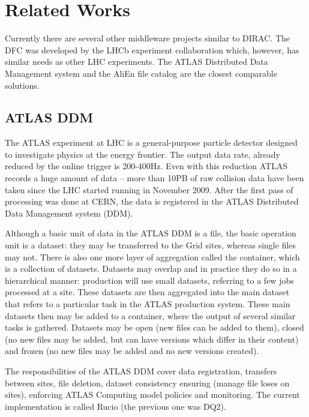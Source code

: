 \chapter{Related Works}
\label{chap:relwork}

Currently there are several other middleware projects similar to DIRAC. The DFC was developed by the LHCb experiment collaboration which, however, has similar needs as other LHC experiments. The ATLAS
Distributed Data Management system and the AliEn file catalog are the closest comparable solutions.


\section{ATLAS DDM}
The ATLAS experiment at LHC is a general-purpose particle detector designed to investigate physics at the energy
frontier. The output data rate, already reduced by the online trigger is  200-400Hz. Even with this reduction 
ATLAS records a huge amount of data – more than 10PB of raw collision data have been taken since the LHC
started running in November 2009. After the first pass of processing was done at CERN, the data is registered in 
the ATLAS Distributed Data Management system (DDM)\cite{ATLASDDM1}.	

Although a basic unit of data in the ATLAS DDM is a file, the basic operation unit is a dataset: they may be
transferred to the Grid sites, whereas single files may not. There is also one more layer of aggregation called 
the container, which is a collection of datasets. Datasets may overlap and in practice they do so in a 
hierarchical manner: production will use small datasets, referring to a few jobs processed at a site. These 
datasets are then aggregated into the main dataset that refers to a particular task in the ATLAS
production system. These main datasets then may be added to a container, where the output of several 
similar tasks is gathered. Datasets may be open (new files can be added to them), closed (no new files
may be added, but can have versions which differ in their content) and frozen (no new files may be added 
and no new versions created). 

The responsibilities of the ATLAS DDM cover data registration, transfers between sites, file deletion, dataset 
consistency ensuring (manage file loses on sites), enforcing ATLAS Computing model policies and monitoring. The
current implementation is called Rucio (the previous one was DQ2).


